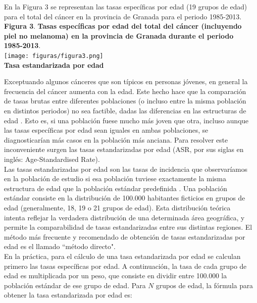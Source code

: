 \noindent En la Figura 3 se representan las tasas específicas por edad (19 grupos de edad) para el total del cáncer en la provincia de Granada para el periodo 1985-2013.\\

\noindent \textbf{Figura 3}. \textbf{Tasas específicas por edad del total del cáncer (incluyendo piel no melanoma) en la provincia de Granada durante el periodo 1985-2013}. \\

\noindent \texttt{[image: figuras/figura3.png]} \\

\noindent \textbf{Tasa estandarizada por edad}

\noindent Exceptuando algunos cánceres que son típicos en personas jóvenes, en general la frecuencia del cáncer aumenta con la edad. Este hecho hace que la comparación de tasas brutas entre diferentes poblaciones (o incluso entre la misma población en distintos periodos) no sea factible, dadas las diferencias en las estructuras de edad \cite{Crocetti2017}. Esto es, si una población fuese mucho más joven que otra, incluso aunque las tasas específicas por edad sean iguales en ambas poblaciones, se diagnosticarían más casos en la población más anciana. Para resolver este inconveniente surgen las tasas estandarizadas por edad (ASR, por sus siglas en inglés: Age-Standardised Rate).\\

\noindent Las tasas estandarizadas por edad son las tasas de incidencia que observaríamos en la población de estudio si esa población tuviese exactamente la misma estructura de edad que la población estándar predefinida \cite{IARC1995}. Una población estándar consiste en la distribución de 100.000 habitantes ficticios en grupos de edad (generalmente, 18, 19 o 21 grupos de edad). Esta distribución teórica intenta reflejar la verdadera distribución de una determinada área geográfica, y permite la comparabilidad de tasas estandarizadas entre sus distintas regiones. El método más frecuente y recomendado de obtención de tasas estandarizadas por edad es el llamado ``método directo"\cite{Wolfenden1923}.\\

\noindent En la práctica, para el cálculo de una tasa estandarizada por edad se calculan primero las tasas específicas por edad. A continuación, la tasa de cada grupo de edad es multiplicada por un peso, que consiste en dividir entre 100.000 la población estándar de ese grupo de edad. Para $N$ grupos de edad, la fórmula para obtener la tasa estandarizada por edad es:

